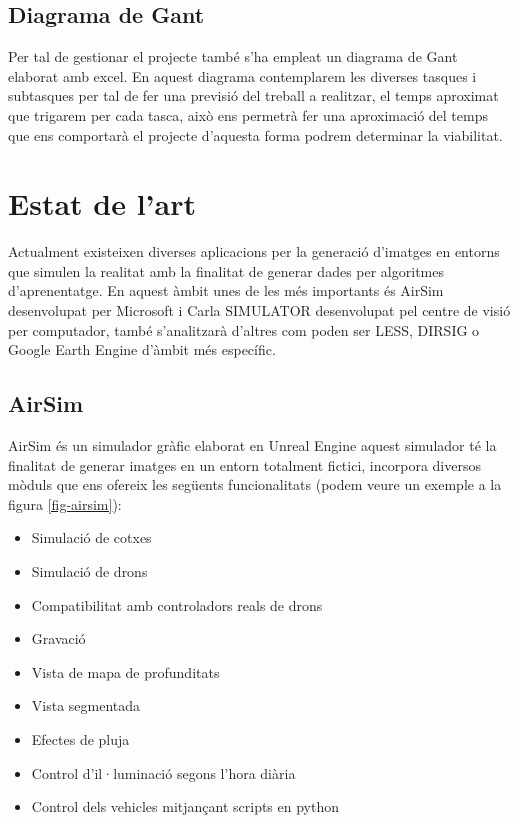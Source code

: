 \documentclass[10pt,a4paper,twocolumn,twoside]{article}
\begin{document}
\subsection{Diagrama de Gant}

Per tal de gestionar el projecte també s'ha empleat un diagrama de Gant elaborat amb excel. En aquest diagrama contemplarem les diverses tasques i subtasques per tal de fer una previsió del treball a realitzar, el temps aproximat que trigarem per cada tasca, això ens permetrà fer una aproximació del temps que ens comportarà el projecte d'aquesta forma podrem determinar la viabilitat.

\section{Estat de l'art}
\label{estatart}

Actualment existeixen diverses aplicacions per la generació d'imatges en entorns que simulen la realitat amb la finalitat de generar dades per algoritmes d'aprenentatge.
En aquest àmbit unes de les més importants és AirSim\cite{airsim} desenvolupat per Microsoft i Carla SIMULATOR\cite{carla} desenvolupat pel centre de visió per computador, també s'analitzarà  d'altres com poden ser LESS\cite{less}, DIRSIG\cite{dirsig} o Google Earth Engine\cite{googleearth} d'àmbit més específic. 

\subsection{AirSim}
AirSim és un simulador gràfic elaborat en Unreal Engine\cite{unreal} aquest simulador té la finalitat de generar imatges en un entorn totalment fictici, incorpora diversos mòduls que ens ofereix les següents funcionalitats (podem veure un exemple a la figura \ref{fig-airsim}):

\begin{itemize}
  \item Simulació de cotxes
  \item Simulació de drons
  \item Compatibilitat amb controladors reals de drons
  \item Gravació 
  \item Vista de mapa de profunditats
  \item Vista segmentada
  \item Efectes de pluja
  \item Control d'il·luminació segons l'hora diària
  \item Control dels vehicles mitjançant scripts en python
\end{itemize}
\end{document}
